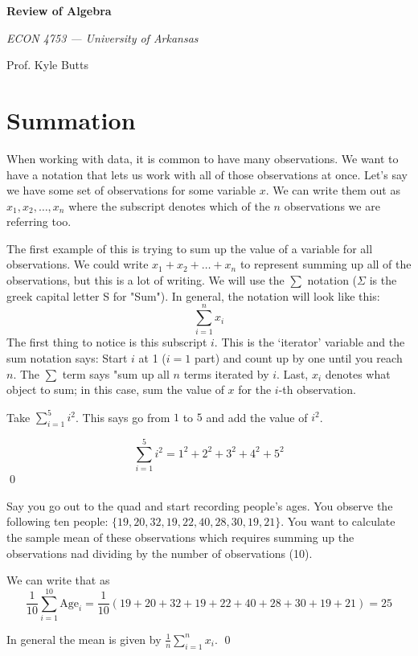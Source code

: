 \documentclass[12pt]{article}
\begin{document}
\begin{center}
  {\Huge\bf Review of Algebra}
  
  \smallskip
  {\large\it  ECON 4753 — University of Arkansas}

  \medskip
  {\large Prof. Kyle Butts}
\end{center}

\section{Summation}

When working with data, it is common to have many observations. We want to have a notation that lets us work with all of those observations at once. Let's say we have some set of observations for some variable $x$. We can write them out as $x_1, x_2, \dots, x_n$ where the subscript denotes which of the $n$ observations we are referring too.

The first example of this is trying to sum up the value of a variable for all observations. We could write $x_1 + x_2 + \dots + x_n$ to represent summing up all of the observations, but this is a lot of writing. 
We will use the $\sum$ notation ($\Sigma$ is the greek capital letter S for "Sum"). 
In general, the notation will look like this:
\begin{equation} 
  \sum_{i = 1}^n x_i
\end{equation}
The first thing to notice is this subscript $i$. This is the `iterator' variable and the sum notation says: Start $i$ at 1 ($i = 1$ part) and count up by one until you reach $n$. The $\sum$ term says "sum up all $n$ terms iterated by $i$. Last, $x_i$ denotes what object to sum; in this case, sum the value of $x$ for the $i$-th observation.

\begin{example}
  Take $\sum_{i=1}^5 i^2$. This says go from $1$ to $5$ and add the value of $i^2$. 
  
  $$
    \sum_{i=1}^5 i^2 = 1^2 + 2^2 + 3^2 + 4^2 + 5^2
  $$
  \qed
\end{example}

\begin{example}
  Say you go out to the quad and start recording people's ages. You observe the following ten people: $\{ 19, 20, 32, 19, 22, 40, 28, 30, 19, 21 \}$. You want to calculate the sample mean of these observations which requires summing up the observations nad dividing by the number of observations (10). 
  
  We can write that as
  $$
    \frac{1}{10} \sum_{i=1}^{10} \text{Age}_i = \frac{1}{10} \left( 19 + 20 + 32 + 19 + 22 + 40 + 28 + 30 + 19 + 21 \right) = 25
  $$
  
  In general the mean is given by $\frac{1}{n} \sum_{i=1}^n x_i$. \qed
\end{example}
\end{document}
